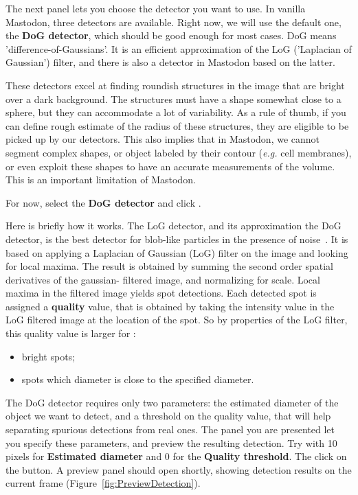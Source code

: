 The next panel lets you choose the detector you want to use.
In vanilla Mastodon, three detectors are available.
Right now, we will use the default one, the \textbf{DoG detector}, which should be good enough for most cases.
DoG means 'difference-of-Gaussians'.
It is an efficient approximation of the LoG ('Laplacian of Gaussian') filter, and there is also a detector in Mastodon based on the latter.

These detectors excel at finding roundish structures in the image that are bright over a dark background.
The structures must have a shape somewhat close to a sphere, but they can accommodate a lot of variability.
As a rule of thumb, if you can define rough estimate of the radius of these structures, they are eligible to be picked up by our detectors. 
This also implies that in Mastodon, we cannot segment complex shapes, or object labeled by their contour (\textit{e.g.} cell membranes), or even exploit these shapes to have an accurate measurements of the volume. 
This is an important limitation of Mastodon.

For now, select the \textbf{DoG detector} and click .
\label{Detection_Cells_DoG_Detector}

Here is briefly  how it works.
The LoG detector, and its approximation the DoG detector, is the best detector for blob-like particles in the presence of noise~\cite{Sage2005}. 
It is based on applying a Laplacian of Gaussian (LoG) filter on the image and looking for local maxima. The result is obtained by summing the second order spatial derivatives of the gaussian- filtered image, and normalizing for scale.
Local maxima in the filtered image yields spot detections. 
Each detected spot is assigned a \textbf{quality} value, that is obtained by taking the intensity value in the LoG filtered image at the location of the spot.
So by properties of the LoG filter, this quality value is larger for :
\begin{itemize}
    \item bright spots;
    \item spots which diameter is close to the specified diameter.
\end{itemize}

The DoG detector requires only two parameters: the estimated diameter of the object we want to detect, and a threshold on the quality value, that will help separating spurious detections from real ones. 
The panel you are presented let you specify these parameters, and preview the resulting detection.
Try with 10 pixels for \textbf{Estimated diameter} and 0 for the \textbf{Quality threshold}.
The click on the  button.
A preview panel should open shortly, showing detection results on the current frame (Figure~\ref{fig:PreviewDetection}).

